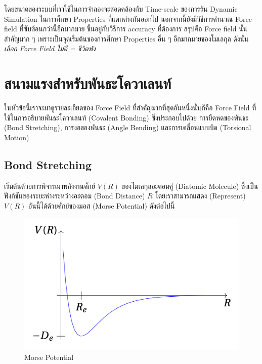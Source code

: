 โดยขนาดของระบบที่เราใช้ในการจำลองจะสอดคล้องกับ Time-scale ของการรัน Dynamic Simulation ในการศึกษา Properties
ที่แตกต่างกันออกไป นอกจากนี้ยังมีวิธีการคำนวณ Force field ที่ซับซ้อนกว่านี้อีกมากมาย ขึ้นอยู่กับวิธีการ accuracy ที่ต้องการ
สรุปคือ Force field นั้นสำคัญมาก ๆ เพราะเป็นจุดเริ่มต้นของการศึกษา Properties อื่น ๆ อีกมากมายของโมเลกุล ดังนั้น
\textit{เลือก Force Field ไม่ดี = ชีวิตพัง}

\section{สนามแรงสำหรับพันธะโควาเลนท์}
\label{sec:md_ff_covalent_bond}

ในหัวข้อนี้เราจะมาดูรายละเอียดของ Force Field ที่สำคัญมากที่สุดอันหนึ่งนั่นก็คือ Force Field ที่ใช้ในการอธิบายพันธะโควาเลนท์ (Covalent
Bonding) ซึ่งประกอบไปด้วย การยืดหดของพันธะ (Bond Stretching), การงอของพันธะ (Angle Bending) และการเคลื่อนแบบบิด (Torsional
Motion)

\subsection{Bond Stretching}

เริ่มต้นด้วยการพิจารณาพลังงานศักย์ $V(R)$ ของโมเลกุลอะตอมคู่ (Diatomic Molecule) ซึ่งเป็นฟังก์ชันของระยะห่างระหว่างอะตอม
(Bond Distance) $R$ โดยเราสามารถแสดง (Represent) $V(R)$ อันนี้ได้ด้วยศักย์ของมอส (Morse Potential) ดังต่อไปนี้

\begin{figure}[htbp]
  \centering
  \includegraphics[width=0.8\linewidth]{fig/morse-potential.png}
  \caption{Morse Potential}
  \label{fig:morse_potential}
\end{figure}

